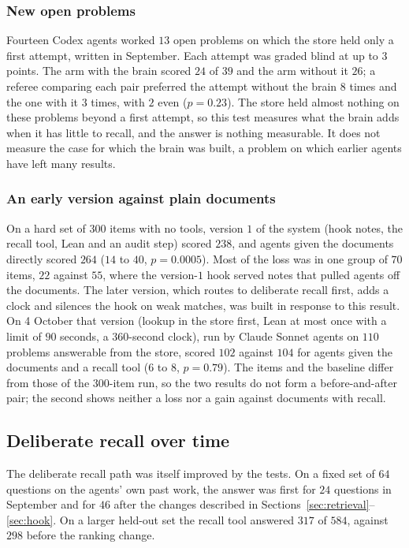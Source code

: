 \subsubsection*{New open problems}
Fourteen Codex agents worked $13$ open problems on which the store held only a first attempt, written in September. Each attempt was graded blind at up to $3$ points. The arm with the brain scored $24$ of $39$ and the arm without it $26$; a referee comparing each pair preferred the attempt without the brain $8$ times and the one with it $3$ times, with $2$ even ($p=0.23$). The store held almost nothing on these problems beyond a first attempt, so this test measures what the brain adds when it has little to recall, and the answer is nothing measurable. It does not measure the case for which the brain was built, a problem on which earlier agents have left many results.

\subsubsection*{An early version against plain documents}
On a hard set of $300$ items with no tools, version $1$ of the system (hook notes, the recall tool, Lean and an audit step) scored $238$, and agents given the documents directly scored $264$ ($14$ to $40$, $p=0.0005$). Most of the loss was in one group of $70$ items, $22$ against $55$, where the version-$1$ hook served notes that pulled agents off the documents. The later version, which routes to deliberate recall first, adds a clock and silences the hook on weak matches, was built in response to this result. On 4 October that version (lookup in the store first, Lean at most once with a limit of $90$ seconds, a $360$-second clock), run by Claude Sonnet agents on $110$ problems answerable from the store, scored $102$ against $104$ for agents given the documents and a recall tool ($6$ to $8$, $p=0.79$). The items and the baseline differ from those of the $300$-item run, so the two results do not form a before-and-after pair; the second shows neither a loss nor a gain against documents with recall.

\subsection{Deliberate recall over time}
The deliberate recall path was itself improved by the tests. On a fixed set of $64$ questions on the agents' own past work, the answer was first for $24$ questions in September and for $46$ after the changes described in Sections~\ref{sec:retrieval}--\ref{sec:hook}. On a larger held-out set the recall tool answered $317$ of $584$, against $298$ before the ranking change.

